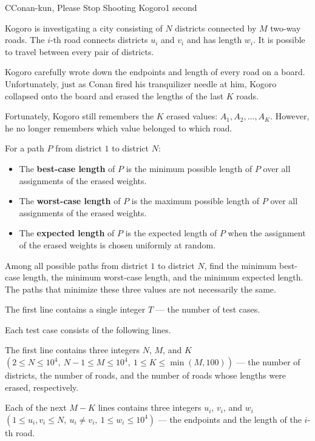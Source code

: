 \begin{problem}{C}{Conan-kun, Please Stop Shooting Kogoro}{1 second}

\noindent
Kogoro is investigating a city consisting of $N$ districts connected by $M$ two-way roads. The $i$-th road connects districts $u_i$ and $v_i$ and has length $w_i$. It is possible to travel between every pair of districts.

\noindent
Kogoro carefully wrote down the endpoints and length of every road on a board. Unfortunately, just as Conan fired his tranquilizer needle at him, Kogoro collapsed onto the board and erased the lengths of the last $K$ roads.

\noindent
Fortunately, Kogoro still remembers the $K$ erased values: $A_1,A_2,\ldots,A_K$. However, he no longer remembers which value belonged to which road.

\noindent
For a path $P$ from district $1$ to district $N$:

\begin{itemize}
   \item The \textbf{best-case length} of $P$ is the minimum possible length of $P$ over all assignments of the erased weights.
   \item The \textbf{worst-case length} of $P$ is the maximum possible length of $P$ over all assignments of the erased weights.
   \item The \textbf{expected length} of $P$ is the expected length of $P$ when the assignment of the erased weights is chosen uniformly at random.
\end{itemize}

\noindent
Among all possible paths from district $1$ to district $N$, find the minimum best-case length, the minimum worst-case length, and the minimum expected length. The paths that minimize these three values are not necessarily the same.

\InputFile

\noindent
The first line contains a single integer $T$ --- the number of test cases.

\noindent
Each test case consists of the following lines.

\noindent
The first line contains three integers $N$, $M$, and $K$ $(2 \le N \le 10^4,\ N-1 \le M \le 10^4,\ 1 \le K \le \min(M,100))$ --- the number of districts, the number of roads, and the number of roads whose lengths were erased, respectively.

\noindent
Each of the next $M-K$ lines contains three integers $u_i$, $v_i$, and $w_i$ $(1 \le u_i,v_i \le N,\ u_i \ne v_i,\ 1 \le w_i \le 10^4)$ --- the endpoints and the length of the $i$-th road.


\end{problem}
